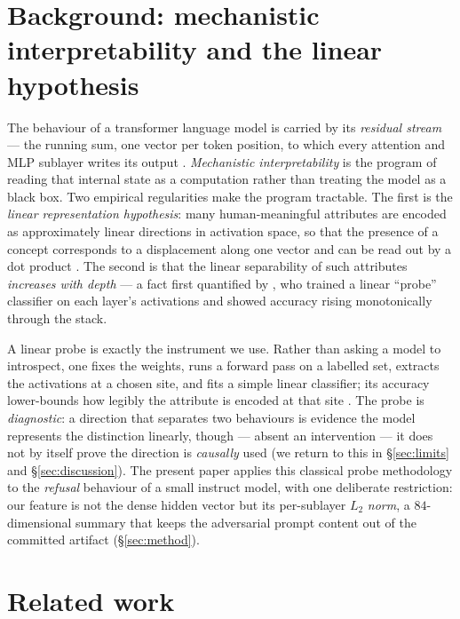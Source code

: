 \documentclass[11pt,a4paper]{article}
\begin{document}
\section{Background: mechanistic interpretability and the linear hypothesis}
\label{sec:background}
The behaviour of a transformer language model is carried by its
\emph{residual stream} --- the running sum, one vector per token position, to
which every attention and MLP sublayer writes its output
\citep{elhage2021mathematical}. \emph{Mechanistic interpretability} is the
program of reading that internal state as a computation rather than treating the
model as a black box. Two empirical regularities make the program tractable.
The first is the \emph{linear representation hypothesis}: many human-meaningful
attributes are encoded as approximately linear directions in activation space,
so that the presence of a concept corresponds to a displacement along one
vector and can be read out by a dot product \citep{park2023linear,
mikolov2013linguistic}. The second is that the linear separability of such
attributes \emph{increases with depth} --- a fact first quantified by
\citet{alain2016probes}, who trained a linear ``probe'' classifier on each
layer's activations and showed accuracy rising monotonically through the stack.

A linear probe is exactly the instrument we use. Rather than asking a model to
introspect, one fixes the weights, runs a forward pass on a labelled set,
extracts the activations at a chosen site, and fits a simple linear classifier;
its accuracy lower-bounds how legibly the attribute is encoded at that site
\citep{alain2016probes,belinkov2022probing}. The probe is \emph{diagnostic}:
a direction that separates two behaviours is evidence the model represents the
distinction linearly, though --- absent an intervention --- it does not by
itself prove the direction is \emph{causally} used (we return to this in
\S\ref{sec:limits} and \S\ref{sec:discussion}). The present paper applies this
classical probe methodology to the \emph{refusal} behaviour of a small instruct
model, with one deliberate restriction: our feature is not the dense hidden
vector but its per-sublayer $L_2$ \emph{norm}, a $84$-dimensional summary that
keeps the adversarial prompt content out of the committed artifact
(\S\ref{sec:method}).

\section{Related work}
\label{sec:related}
\end{document}
